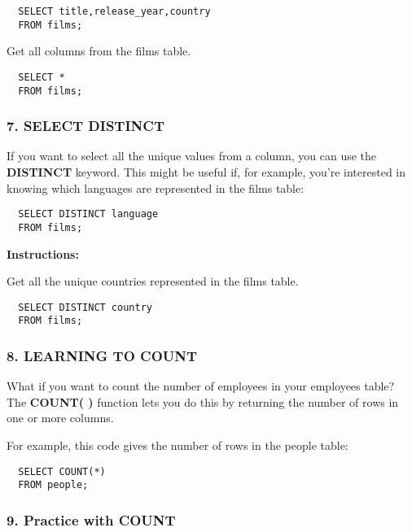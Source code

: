 \documentclass[
]{article}
\begin{document}
\begin{verbatim}
  SELECT title,release_year,country
  FROM films;
\end{verbatim}

Get all columns from the films table.

\begin{verbatim}
  SELECT *
  FROM films;
\end{verbatim}

\hypertarget{select-distinct}{%
\subsubsection{7. SELECT DISTINCT}\label{select-distinct}}

If you want to select all the unique values from a column, you can use
the \textbf{DISTINCT} keyword. This might be useful if, for example,
you're interested in knowing which languages are represented in the
films table:

\begin{verbatim}
  SELECT DISTINCT language
  FROM films;
\end{verbatim}

\textbf{Instructions:}

Get all the unique countries represented in the films table.

\begin{verbatim}
  SELECT DISTINCT country
  FROM films;
\end{verbatim}

\hypertarget{learning-to-count}{%
\subsubsection{8. LEARNING TO COUNT}\label{learning-to-count}}

What if you want to count the number of employees in your employees
table? The \textbf{COUNT( )} function lets you do this by returning the
number of rows in one or more columns.

For example, this code gives the number of rows in the people table:

\begin{verbatim}
  SELECT COUNT(*)
  FROM people;
\end{verbatim}

\hypertarget{practice-with-count}{%
\subsubsection{9. Practice with COUNT}\label{practice-with-count}}
\end{document}
